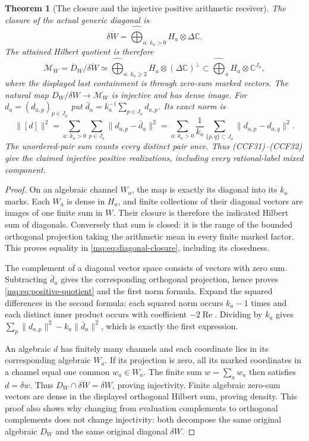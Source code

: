 \documentclass[11pt,a4paper]{article}
\newtheorem{theorem}{Theorem}[section]
\theoremstyle{definition}\newtheorem{definition}[theorem]{Definition}
\newcommand{\C}{\mathbb C}\newcommand{\R}{\mathbb R}
\begin{document}
\begin{theorem}[The closure and the injective positive arithmetic receiver]
\label{mq:thm:closure}
The closure of the actual generic diagonal is
\[
 \overline{\delta W}=
 \widehat\bigoplus_{a:\,k_a>0}H_a\otimes\Delta\C.
 \tag{MQ16}\label{mq:eq:diagonal-closure}
\]
The attained Hilbert quotient is therefore
\[
 \mathscr M_W=\overline D_W/\overline{\delta W}
 \simeq\widehat\bigoplus_{a:\,k_a\ge2}
          H_a\otimes(\Delta\C)^{\perp}\subset
          \widehat\bigoplus_a H_a\otimes\C^{J_a},
 \tag{MQ17}\label{mq:eq:positive-quotient}
\]
where the displayed last containment is through zero-sum marked
vectors. The natural map
$D_W/\delta W\to\mathscr M_W$ is injective and has dense image.
For $d_a=(d_{a,p})_{p\in J_a}$ put
$\bar d_a=k_a^{-1}\sum_{p\in J_a}d_{a,p}$. Its exact norm is
\[
 \|[d]\|^2=
 \sum_{a:\,k_a>0}\sum_{p\in J_a}\|d_{a,p}-\bar d_a\|^2
 =\sum_{a:\,k_a>0}\frac1{k_a}
           \sum_{\{p,q\}\subset J_a}\|d_{a,p}-d_{a,q}\|^2.
 \tag{MQ18}\label{mq:eq:variance}
\]
The unordered-pair sum counts every distinct pair once.
Thus (CCF31)--(CCF32) give the claimed injective positive
realizations, including every rational-label mixed component.
\end{theorem}
\begin{proof}
On an algebraic channel $W_a$, the map is exactly its diagonal
into its $k_a$ marks. Each $W_a$ is dense in $H_a$, and finite
collections of their diagonal vectors are images of one finite sum
in $W$. Their closure is therefore the indicated Hilbert sum of
diagonals. Conversely that sum is closed: it is the range of the
bounded orthogonal projection taking the arithmetic mean in every
finite marked factor. This proves equality in
\eqref{mq:eq:diagonal-closure}, including its closedness.

The complement of a diagonal vector space consists of vectors with
zero sum. Subtracting $\bar d_a$ gives the corresponding orthogonal
projection, hence proves \eqref{mq:eq:positive-quotient} and the first
norm formula. Expand the squared differences in the second formula:
each squared norm occurs $k_a-1$ times and each distinct inner
product occurs with coefficient $-2\operatorname{Re}$. Dividing
by $k_a$ gives
$\sum_p\|d_{a,p}\|^2-k_a\|\bar d_a\|^2$, which is exactly
the first expression.

An algebraic $d$ has finitely many channels and each coordinate
lies in its corresponding algebraic $W_a$. If its projection is
zero, all its marked coordinates in a channel equal one common
$w_a\in W_a$. The finite sum $w=\sum_a w_a$ then satisfies
$d=\delta w$. Thus
$D_W\cap\overline{\delta W}=\delta W$, proving injectivity.
Finite algebraic zero-sum vectors are dense in the displayed
orthogonal Hilbert sum, proving density. This proof also shows
why changing from evaluation complements to orthogonal complements
does not change injectivity: both decompose the same original
algebraic $D_W$ and the same original diagonal $\delta W$.
\end{proof}
\end{document}
